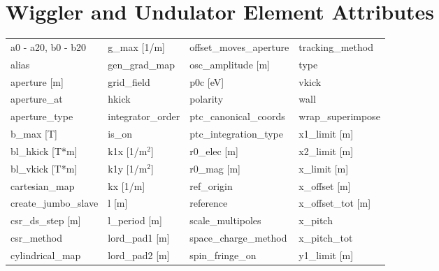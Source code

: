  \section{Wiggler and Undulator Element Attributes}
 \label{s:list.wiggler}
 
 \begin{tabular}{llll} \toprule
a0 - a20, b0 - b20               & g_max [1/m]                      & offset_moves_aperture            & tracking_method                  \\
alias                            & gen_grad_map                     & osc_amplitude [m]                & type                             \\
aperture [m]                     & grid_field                       & p0c [eV]                         & vkick                            \\
aperture_at                      & hkick                            & polarity                         & wall                             \\
aperture_type                    & integrator_order                 & ptc_canonical_coords             & wrap_superimpose                 \\
b_max [T]                        & is_on                            & ptc_integration_type             & x1_limit [m]                     \\
bl_hkick [T*m]                   & k1x [1/m$^2$]                    & r0_elec [m]                      & x2_limit [m]                     \\
bl_vkick [T*m]                   & k1y [1/m$^2$]                    & r0_mag [m]                       & x_limit [m]                      \\
cartesian_map                    & kx [1/m]                         & ref_origin                       & x_offset [m]                     \\
create_jumbo_slave               & l [m]                            & reference                        & x_offset_tot [m]                 \\
csr_ds_step [m]                  & l_period [m]                     & scale_multipoles                 & x_pitch                          \\
csr_method                       & lord_pad1 [m]                    & space_charge_method              & x_pitch_tot                      \\
cylindrical_map                  & lord_pad2 [m]                    & spin_fringe_on                   & y1_limit [m]                     \\

\end{tabular}
